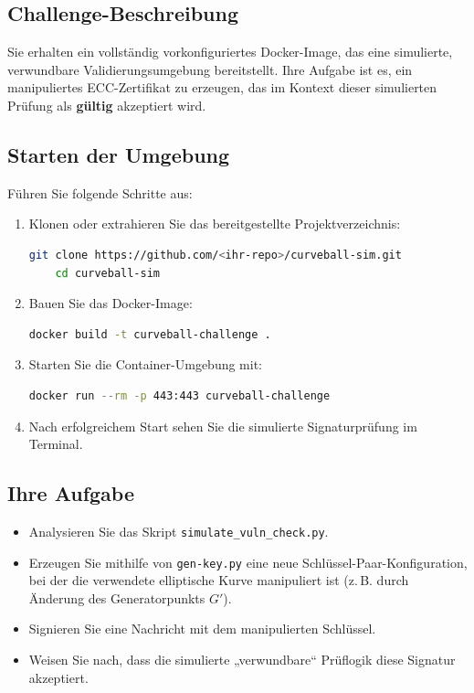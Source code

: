 \documentclass{article}
\begin{document}
\subsection{Challenge-Beschreibung}

Sie erhalten ein vollständig vorkonfiguriertes Docker-Image, das eine simulierte, verwundbare Validierungsumgebung bereitstellt. Ihre Aufgabe ist es, ein manipuliertes ECC-Zertifikat zu erzeugen, das im Kontext dieser simulierten Prüfung als \textbf{gültig} akzeptiert wird.

\subsection{Starten der Umgebung}

Führen Sie folgende Schritte aus:

\begin{enumerate}
    \item Klonen oder extrahieren Sie das bereitgestellte Projektverzeichnis:
    \begin{lstlisting}[language=bash]
    git clone https://github.com/<ihr-repo>/curveball-sim.git
    cd curveball-sim
    \end{lstlisting}

    \item Bauen Sie das Docker-Image:
    \begin{lstlisting}[language=bash]
    docker build -t curveball-challenge .
    \end{lstlisting}

    \item Starten Sie die Container-Umgebung mit:
    \begin{lstlisting}[language=bash]
    docker run --rm -p 443:443 curveball-challenge
    \end{lstlisting}

    \item Nach erfolgreichem Start sehen Sie die simulierte Signaturprüfung im Terminal.
\end{enumerate}

\subsection{Ihre Aufgabe}

\begin{itemize}
    \item Analysieren Sie das Skript \texttt{simulate\_vuln\_check.py}.
    \item Erzeugen Sie mithilfe von \texttt{gen-key.py} eine neue Schlüssel-Paar-Konfiguration, bei der die verwendete elliptische Kurve manipuliert ist (z. B. durch Änderung des Generatorpunkts $G'$).
    \item Signieren Sie eine Nachricht mit dem manipulierten Schlüssel.
    \item Weisen Sie nach, dass die simulierte „verwundbare“ Prüflogik diese Signatur akzeptiert.
\end{itemize}
\end{document}
